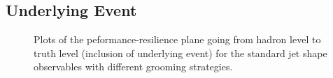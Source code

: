 \documentclass[11pt,letterpaper]{article}
\begin{document}
\subsection{Underlying Event}\label{jetsub_2prong_sec:UE}


\begin{figure}
  \caption{Plots of the peformance-resilience plane going from hadron level to truth level (inclusion of underlying event) for the standard jet shape observables with different grooming strategies.}\label{jetsub_2prong_fig:grooming-UE}
\end{figure}
\end{document}
